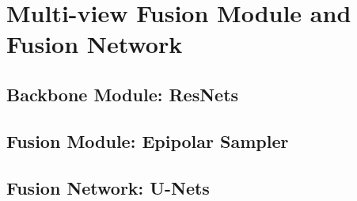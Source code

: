 \chapter{Multi-view Fusion Module and Fusion Network}

\section{Backbone Module: ResNets}
\section{Fusion Module: Epipolar Sampler}\label{ch4:fusion-module}
\section{Fusion Network: U-Nets}